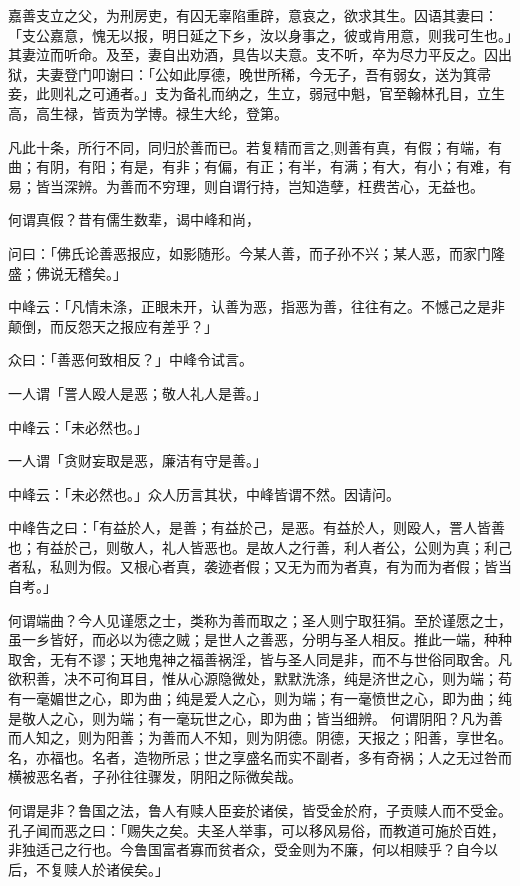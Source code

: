\documentclass[letterpaper,12pt,english]{sphinxmanual}
\begin{document}
嘉善支立之父，为刑房吏，有囚无辜陷重辟，意哀之，欲求其生。囚语其妻曰：「支公嘉意，愧无以报，明日延之下乡，汝以身事之，彼或肯用意，则我可生也。」其妻泣而听命。及至，妻自出劝酒，具告以夫意。支不听，卒为尽力平反之。囚出狱，夫妻登门叩谢曰：「公如此厚德，晚世所稀，今无子，吾有弱女，送为箕帚妾，此则礼之可通者。」支为备礼而纳之，生立，弱冠中魁，官至翰林孔目，立生高，高生禄，皆贡为学博。禄生大纶，登第。

凡此十条，所行不同，同归於善而已。若复精而言之,则善有真，有假；有端，有曲；有阴，有阳；有是，有非；有偏，有正；有半，有满；有大，有小；有难，有易；皆当深辨。为善而不穷理，则自谓行持，岂知造孽，枉费苦心，无益也。

何谓真假？昔有儒生数辈，谒中峰和尚，

问曰：「佛氏论善恶报应，如影随形。今某人善，而子孙不兴；某人恶，而家门隆盛；佛说无稽矣。」

中峰云：「凡情未涤，正眼未开，认善为恶，指恶为善，往往有之。不憾己之是非颠倒，而反怨天之报应有差乎？」

众曰：「善恶何致相反？」中峰令试言。

一人谓「詈人殴人是恶；敬人礼人是善。」

中峰云：「未必然也。」

一人谓「贪财妄取是恶，廉洁有守是善。」

中峰云：「未必然也。」众人历言其状，中峰皆谓不然。因请问。

中峰告之曰：「有益於人，是善；有益於己，是恶。有益於人，则殴人，詈人皆善也；有益於己，则敬人，礼人皆恶也。是故人之行善，利人者公，公则为真；利己者私，私则为假。又根心者真，袭迹者假；又无为而为者真，有为而为者假；皆当自考。」

何谓端曲？今人见谨愿之士，类称为善而取之；圣人则宁取狂狷。至於谨愿之士，虽一乡皆好，而必以为德之贼；是世人之善恶，分明与圣人相反。推此一端，种种取舍，无有不谬；天地鬼神之福善祸淫，皆与圣人同是非，而不与世俗同取舍。凡欲积善，决不可徇耳目，惟从心源隐微处，默默洗涤，纯是济世之心，则为端；苟有一毫媚世之心，即为曲；纯是爱人之心，则为端；有一毫愤世之心，即为曲；纯是敬人之心，则为端；有一毫玩世之心，即为曲；皆当细辨。 何谓阴阳？凡为善而人知之，则为阳善；为善而人不知，则为阴德。阴德，天报之；阳善，享世名。名，亦福也。名者，造物所忌；世之享盛名而实不副者，多有奇祸；人之无过咎而横被恶名者，子孙往往骤发，阴阳之际微矣哉。

何谓是非？鲁国之法，鲁人有赎人臣妾於诸侯，皆受金於府，子贡赎人而不受金。孔子闻而恶之曰：「赐失之矣。夫圣人举事，可以移风易俗，而教道可施於百姓，非独适己之行也。今鲁国富者寡而贫者众，受金则为不廉，何以相赎乎？自今以后，不复赎人於诸侯矣。」
\end{document}
